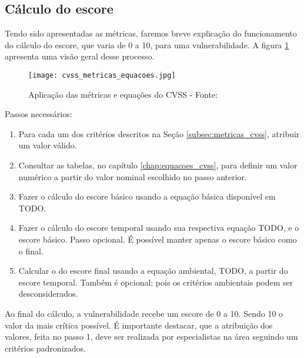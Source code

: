 		\subsection{Cálculo do escore}
			Tendo sido apresentadas as métricas, faremos breve explicação
			do funcionamento do cálculo do escore,
			que varia de 0 a 10, para uma vulnerabilidade.
			A figura \ref{fig:cvss_metricas_equacoes} apresenta uma visão geral desse processo. 
			\begin{figure}
				\begin{center}
					\texttt{[image: cvss\_metricas\_equacoes.jpg]}
					\caption{Aplicação das métricas e equações do CVSS - Fonte: \cite{Mell2007}}
					\label{fig:cvss_metricas_equacoes}
				\end{center}
			\end{figure}
			Passos necessários:
			\begin{enumerate}
				\item{Para cada um dos critérios descritos na Seção \ref{subsec:metricas_cvss},
					atribuir um valor válido.}
				\item{Consultar as tabelas, no capítulo	\ref{chap:equacoes_cvss},
					para definir um valor numérico a partir do valor nominal escolhido no passo anterior.}
				\item{Fazer o cálculo do escore básico usando a equação básica disponível em TODO.}
				\item{Fazer o cálculo do escore temporal usando sua respectiva equação TODO,
					 e o escore básico.	Passo opcional. É possível manter apenas o escore básico como o final.}
				\item{Calcular o do escore final usando a equação ambiental, TODO,
					 a partir do escore temporal. Também é opcional; pois os critérios 
					ambientais podem ser desconsiderados.}
			\end{enumerate}
			
			
			Ao final do cálculo, a vulnerabilidade recebe um escore de 0 a 10.
			Sendo 10 o valor da mais crítica possível. É importante destacar, que a atribuição
			dos valores, feita no passo 1, deve ser realizada por especialistas na área seguindo
			um critérios padronizados.

			
